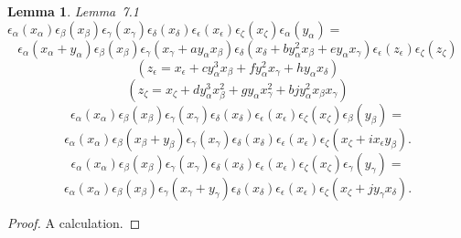 \documentclass{memo-l}
\newtheorem{lemma}[theorem]{Lemma}
\theoremstyle{definition}
\theoremstyle{remark}
\numberwithin{section}{chapter}
\numberwithin{equation}{chapter}
\begin{document}
\begin{lemma}{Lemma\ 7.1}  ${\epsilon}_{{\alpha}}(x_{{\alpha}})
{\epsilon}_{{\beta}}(x_{{\beta}}){\epsilon}_{{\gamma}}(x_{{\gamma}})
{\epsilon}_{{\delta}}(x_{{\delta}}){\epsilon}_{{\epsilon}}(x_{{\epsilon}})
{\epsilon}_{{\zeta}}(x_{{\zeta}}){\epsilon}_{{\alpha}}(y_{{\alpha}}) =$
$$
{\epsilon}_{{\alpha}}(x_{{\alpha}}+y_{{\alpha}}){\epsilon}_{{\beta}}
(x_{{\beta}}){\epsilon}_{{\gamma}}(x_{{\gamma}}+ay_{{\alpha}}x_{{\beta}})
{\epsilon}_{{\delta}}(x_{{\delta}}+by_{{\alpha}}^{2}x_{{\beta}}+ey_{{\alpha}}
x_{{\gamma}}){\epsilon}_{{\epsilon}}(z_{{\epsilon}}){\epsilon}_{{\zeta}}
(z_\zeta)
$$
$$
(z_{{\epsilon}} = x_{{\epsilon}}+cy_{{\alpha}}^{3}x_{{\beta}} +
fy_{{\alpha}}^{2}x_{{\gamma}}+hy_{{\alpha}}x_{{\delta}})$$
$$(z_{{\zeta}} = x_{{\zeta}}+dy_{{\alpha}}^{3}x_{{\beta}}^{2}+gy_{{\alpha}}
x_{{\gamma}}^{2}+bjy_{{\alpha}}^{2}x_{{\beta}}x_{{\gamma}})$$
$${\epsilon}_{{\alpha}}(x_{{\alpha}}){\epsilon}_{{\beta}}(x_{{\beta}})
{\epsilon}_{{\gamma}}(x_{{\gamma}}){\epsilon}_{{\delta}}(x_{{\delta}})
{\epsilon}_{{\epsilon}}(x_{{\epsilon}}){\epsilon}_{{\zeta}}(x_{{\zeta}})
{\epsilon}_{{\beta}}(y_{{\beta}}) =$$
$${\epsilon}_{{\alpha}}(x_{{\alpha}}){\epsilon}_{{\beta}}(x_{{\beta}} +
y_{{\beta}}){\epsilon}_{{\gamma}}(x_{{\gamma}}){\epsilon}_{{\delta}}
(x_{{\delta}}){\epsilon}_{{\epsilon}}(x_{{\epsilon}}){\epsilon}_{{\zeta}}
(x_{{\zeta}}+ix_{{\epsilon}}y_\beta).$$
$${\epsilon}_{{\alpha}}(x_{{\alpha}}){\epsilon}_{{\beta}}(x_{{\beta}})
{\epsilon}_{{\gamma}}(x_{{\gamma}}){\epsilon}_{{\delta}}(x_{{\delta}})
{\epsilon}_{{\epsilon}}(x_{{\epsilon}}){\epsilon}_{{\zeta}}(x_{{\zeta}})
{\epsilon}_{{\gamma}}(y_{{\gamma}}) =$$
$${\epsilon}_{{\alpha}}(x_{{\alpha}}){\epsilon}_{{\beta}}(x_{{\beta}})
{\epsilon}_{{\gamma}}(x_{{\gamma}}+y_{{\gamma}}){\epsilon}_{{\delta}}
(x_{{\delta}}){\epsilon}_{{\epsilon}}(x_{{\epsilon}}){\epsilon}_{{\zeta}}
(x_{{\zeta}}+jy_{{\gamma}}x_{\delta}).$$
\end{lemma}

\begin{proof}    A calculation.
\end{proof}

{\medskip}
\end{document}
